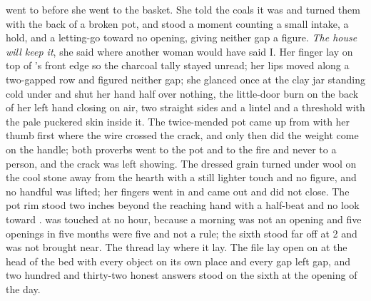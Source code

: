  went to  before she went to the basket. She told the coals it was  and turned them with the back of a broken pot, and stood a moment counting a small intake, a hold, and a letting-go toward no opening, giving neither gap a figure. \emph{The house will keep it}, she said where another woman would have said I. Her finger lay on top of 's front edge so the charcoal tally stayed unread; her lips moved along a two-gapped row and figured neither gap; she glanced once at the clay jar standing cold under  and shut her hand half over nothing, the little-door burn on the back of her left hand closing on air, two straight sides and a lintel and a threshold with the pale puckered skin inside it. The twice-mended pot came up from  with her thumb first where the wire crossed the crack, and only then did the weight come on the handle; both proverbs went to the pot and to the fire and never to a person, and the crack was left showing. The dressed grain turned under wool on the cool stone away from the hearth with a still lighter touch and no figure, and no handful was lifted; her fingers went in and came out and did not close. The pot rim stood two inches beyond the reaching hand with a half-beat and no look toward .  was touched at no hour, because a morning was not an opening and five openings in five months were five and not a rule; the sixth stood far off at  2 and was not brought near. The thread lay where it lay. The file lay open on  at the head of the bed with every object on its own place and every gap left gap, and two hundred and thirty-two honest answers stood on the sixth at the opening of the day.

